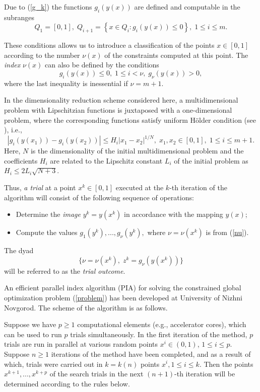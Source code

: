 \documentclass{llncs}
\begin{document}
Due to (\ref{g_k}) the functions $g_i(y(x))$ are defined 
and computable in the subranges 
\[
Q_1=[0,1], \; Q_{i+1}=\left\{x \in Q_i : g_i(y(x)) \leq 0 \right\}, \; 1 \leq i \leq m.
\]

These conditions allows us to introduce a classification of the points $x \in [0,1]$ according to 
the number $\nu (x)$ of the constraints computed at this point. The \textit{index} $\nu(x)$ can 
also be defined by the conditions
\begin{equation}\label{nu}
g_i(y(x)) \leq 0, \; 1 \leq i < \nu, \; g_\nu(y(x))>0,
\end{equation}
where the last inequality is inessential if $\nu=m+1$.

In the dimensionality reduction scheme considered here, a multidimensional problem with 
Lipschitzian functions is juxtaposed with a one-dimensional problem, where the corresponding 
functions satisfy uniform H{\"o}lder condition (see \cite{Strongin2013}), i.e.,
\[
\left|g_i(y(x_1))-g_i (y(x_2))\right| \leq H_i \left|x_1-x_2 \right|^{1/N}, \; x_1,x_2\in [0,1], \; 
1\leq i \leq m+1.
\]
Here, $N$ is the dimensionality of the initial multidimensional problem and the coefficients 
$H_i$ are related to the Lipschitz constant $L_i$ of the initial problem as $H_i \leq 2L_i 
\sqrt{N+3}$.

Thus, \textit{a trial} at a point $x^k \in [0,1]$ executed at the $k$-th iteration of the algorithm 
will consist of the following sequence of operations:
\begin{itemize}
	\item Determine the \textit{image} $y^k=y(x^k)$ in accordance with the mapping 
$y(x)$;
	\item Compute the values $g_1(y^k),..., g_\nu(y^k),$ where $\nu = \nu(x^k)$ is from 
(\ref{nu}). 
\end{itemize}
The dyad 
\begin{equation} \label{trial_result}
 \{ \nu=\nu(x^k), \; z^k=g_\nu(y(x^k)) \} 
\end{equation}
will be referred to as the \textit{trial outcome}.

An efficient parallel index algorithm (PIA) for solving the constrained global optimization 
problem (\ref{problem}) has been developed at University of Nizhni Novgorod. The scheme of 
the algorithm is as follows.

Suppose we have $p \geq 1$  computational elements (e.g., accelerator cores), which can be 
used to run $p$ trials simultaneously. In the first iteration of the method, $p$ trials are run in 
parallel at various random points $x^i\in(0,1)$, $1\leq i \leq p$. 
Suppose $n \geq 1$  iterations of the method have been completed, and as a result of which, 
trials were carried out in $k=k(n)$ points $x^i, 1\leq i \leq k$. Then the points 
$x^{k+1},...,x^{k+p}$  of the search trials in the next $(n+1)$-th iteration will be determined 
according to the rules below.
\end{document}

